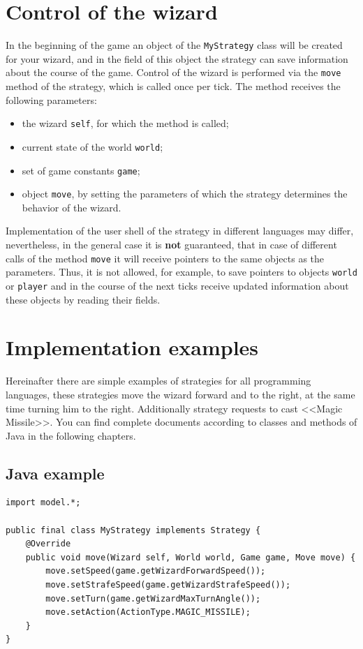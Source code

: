 \section{Control of the wizard}
 
In the beginning of the game an object of the \texttt{MyStrategy} class will be created for your wizard, and in the field of this object the strategy can save information
about the course of the game. Control of the wizard is performed via the \texttt{move} method of the strategy, which is called once per tick. The method
receives the following parameters:
\begin{itemize}
 \item the wizard \texttt{self}, for which the method is called;
 \item current state of the world \texttt{world};
 \item set of game constants \texttt{game};
 \item object \texttt{move}, by setting the parameters of which the strategy determines the behavior of the wizard.
\end{itemize}
 
Implementation of the user shell of the strategy in different languages may differ, nevertheless, in the general case it is \textbf{not} guaranteed, that in case of different calls
of the method \texttt{move} it will receive pointers to the same objects as the parameters. Thus, it is not allowed, for example,
to save pointers to objects \texttt{world} or \texttt{player} and in the course of the next ticks receive updated information about these objects by reading
their fields.
 
\newpage
\section{Implementation examples}
 
Hereinafter there are simple examples of strategies for all programming languages, these strategies move the wizard forward and to the right, at the same time
turning him to the right. Additionally strategy requests to cast <<Magic Missile>>. You can find complete documents
according to classes and methods of Java in the following chapters.

\subsection{Java example}

\begin{verbatim}
import model.*;

public final class MyStrategy implements Strategy {
    @Override
    public void move(Wizard self, World world, Game game, Move move) {
        move.setSpeed(game.getWizardForwardSpeed());
        move.setStrafeSpeed(game.getWizardStrafeSpeed());
        move.setTurn(game.getWizardMaxTurnAngle());
        move.setAction(ActionType.MAGIC_MISSILE);
    }
}
\end{verbatim}

